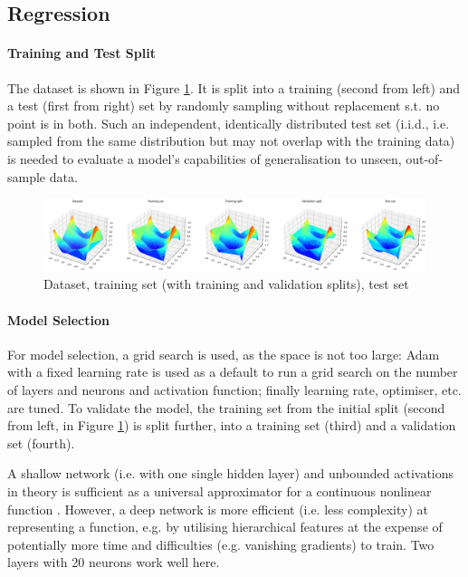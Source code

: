 \newpage

\subsection{Regression}

\paragraph{Training and Test Split}

The dataset is shown in Figure \ref{fig:regression-splits}.
It is split into a training (second from left) and a test (first from right) set
by randomly sampling without replacement s.t. no point is in both.
Such an independent, identically distributed test set
(i.i.d., i.e. sampled from the same distribution but may not overlap with the training data)
is needed to evaluate a model's capabilities of generalisation to unseen, out-of-sample data.

\begin{figure}[h!]
    \includegraphics[width=\textwidth]{figures/regression-splits.png}
    \caption{Dataset, training set (with training and validation splits), test set}
    \label{fig:regression-splits}
\end{figure}
\vspace{-10pt}

\paragraph{Model Selection}

For model selection, a grid search is used, as the space is not too large:
Adam with a fixed learning rate is used as a default to run a grid search on the number of layers and neurons and activation function; finally learning rate, optimiser, etc. are tuned.
To validate the model, the training set from the initial split (second from left, in Figure \ref{fig:regression-splits}) is split further, into a training set (third) and a validation set (fourth).

A shallow network (i.e. with one single hidden layer) and unbounded activations in theory is sufficient as a universal approximator for a continuous nonlinear function \citep{prince2023understanding}.
However, a deep network is more efficient (i.e. less complexity) at representing a function, e.g. by utilising hierarchical features \citep{telgarsky2016benefitsdepthneuralnetworks}
at the expense of potentially more time and difficulties (e.g. vanishing gradients) to train.
Two layers with 20 neurons work well here.

